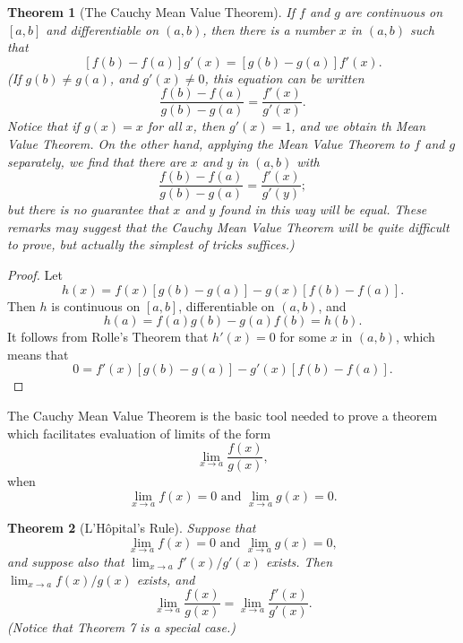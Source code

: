 \documentclass{article}
\newtheorem{theorem}{Theorem}
\begin{document}
\begin{theorem}[The Cauchy Mean Value Theorem]
  If $f$ and $g$ are continuous on $[a, b]$ and differentiable on $(a, b)$,
  then there is a number $x$ in $(a, b)$ such that \[
    [f(b) - f(a)]g'(x) = [g(b) - g(a)]f'(x).
  \] (If $g(b) \neq g(a)$, and $g'(x) \neq 0$, this equation can be written \[
    \frac{f(b) - f(a)}{g(b) - g(a)} = \frac{f'(x)}{g'(x)}.
  \] Notice that if $g(x) = x$ for all $x$, then $g'(x) = 1$, and we obtain th
  Mean Value Theorem. On the other hand, applying the Mean Value Theorem to $f$
  and $g$ separately, we find that there are $x$ and $y$ in $(a, b)$ with \[
    \frac{f(b) - f(a)}{g(b) - g(a)} = \frac{f'(x)}{g'(y)};
  \] but there is no guarantee that $x$ and $y$ found in this way will be
  equal. These remarks may suggest that the Cauchy Mean Value Theorem will be
  quite difficult to prove, but actually the simplest of tricks suffices.)
\end{theorem}
\begin{proof}
  Let \[
    h(x) = f(x)[g(b) - g(a)] - g(x)[f(b) - f(a)].
  \] Then $h$ is continuous on $[a, b]$, differentiable on $(a, b)$, and \[
    h(a) = f(a)g(b) - g(a)f(b) = h(b).
  \] It follows from Rolle's Theorem that $h'(x) = 0$ for some $x$
  in $(a, b)$, which means that \[
    0 = f'(x)[g(b) - g(a)] - g'(x)[f(b) - f(a)].
  \]
\end{proof}

The Cauchy Mean Value Theorem is the basic tool needed to prove a theorem which
facilitates evaluation of limits of the form \[
  \lim_{x \to a} \frac{f(x)}{g(x)},
\] when \[
  \lim_{x \to a} f(x) = 0 \text{ and } \lim_{x \to a} g(x) = 0.
\]

\begin{theorem}[L'H{\^o}pital's Rule]
  Suppose that \[
    \lim_{x \to a} f(x) = 0 \text{ and } \lim_{x \to a} g(x) = 0,
  \] and suppose also that $\lim_{x \to a} f'(x)/g'(x)$ exists. Then
  $\lim_{x \to a} f(x)/g(x)$ exists, and \[
    \lim_{x \to a} \frac{f(x)}{g(x)} = \lim_{x \to a} \frac{f'(x)}{g'(x)}.
  \] (Notice that Theorem 7 is a special case.)
\end{theorem}
\end{document}

